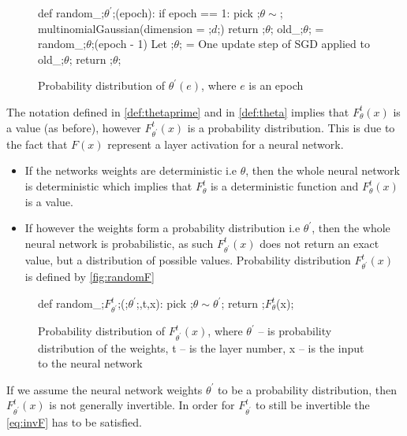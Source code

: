 \begin{figure}[H]
    \begin{pythonfigure}
      def random_;$\theta^\prime$;(epoch):
        if epoch == 1:
          pick ;$\theta \sim$; multinomialGaussian(dimension = ;$d$;)
          return ;$\theta$;
        old_;$\theta$; = random_;$\theta$;(epoch - 1)
        Let ;$\theta$; = One update step of SGD applied to old_;$\theta$;
        return ;$\theta$;

    \end{pythonfigure}
    \caption{Probability distribution of $\theta^\prime(e)$, where $e$ is an
    epoch}
    \label{fig:randomTheta}
\end{figure}

The notation defined in \autoref{def:thetaprime} and in \autoref{def:theta}
implies that $F_\theta^t(x)$ is a value (as before), however
$F_{\theta^\prime}^t(x)$ is a probability distribution.  This is due to the fact
that $F(x)$ represent a layer activation for a neural network.
\begin{itemize}
  \item{
      If the networks weights are deterministic i.e $\theta$, then the whole
      neural network is deterministic which implies that $F_\theta^t$ is a
      deterministic function and $F_\theta^t(x)$ is a value.
    }
  \item{
      If however the weights form a probability distribution i.e
      $\theta^\prime$, then the whole neural network is probabilistic, as such
      $F_{\theta^\prime}^t(x)$ does not return an exact value, but a
      distribution of possible values. Probability distribution
      $F_{\theta^\prime}^t(x)$ is defined by \autoref{fig:randomF}
    }
\end{itemize}

\begin{figure}[H]
    \begin{pythonfigure}
      def random_;$F_{\theta^\prime}^t$;(;$\theta^\prime$;,t,x):
        pick ;$\theta\sim\theta^\prime$; 
        return ;$F_{\theta}^t$(x);
    \end{pythonfigure}
    \caption{Probability distribution of $F_{\theta^\prime}^t(x)$, where
    $\theta^\prime$ -- is probability distribution of the weights, t -- is the
    layer number, x -- is the input to the neural network}
    \label{fig:randomF}
\end{figure}

If we assume the neural network weights $\theta^\prime$ to be a probability
distribution, then $F_{\theta^\prime}^t(x)$ is not generally invertible.  In
order for $F_{\theta^\prime}^t$ to still be invertible the \autoref{eq:invF} has
to be satisfied.
  
